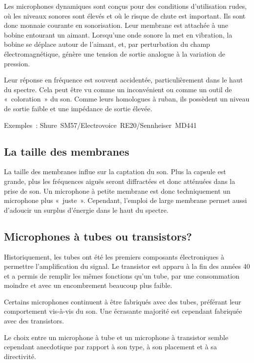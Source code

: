 \documentclass[
]{book}
\begin{document}
Les microphones dynamiques sont conçus pour des conditions d'utilisation rudes, où les niveaux sonores sont élevés et où le risque de chute est important. Ils sont donc monnaie courante en sonorisation. Leur membrane est attachée à une bobine entourant un aimant. Lorsqu'une onde sonore la met en vibration, la bobine se déplace autour de l'aimant, et, par perturbation du champ électromagnétique, génère une tension de sortie analogue à la variation de pression.

Leur réponse en fréquence est souvent accidentée, particulièrement dans le haut du spectre. Cela peut être vu comme un inconvénient ou comme un outil de «~coloration~» du son. Comme leurs homologues à ruban, ils possèdent un niveau de sortie faible et une impédance de sortie élevée.

Exemples~: Shure~SM57/Electrovoice~RE20/Sennheiser~MD441

\hypertarget{la-taille-des-membranes}{%
\subsection{La taille des membranes}\label{la-taille-des-membranes}}

La taille des membranes influe sur la captation du son. Plus la capsule est grande, plus les fréquences aiguës seront diffractées et donc atténuées dans la prise de son. Un microphone à petite membrane est donc techniquement un microphone plus «~juste~». Cependant, l'emploi de large membrane permet aussi d'adoucir un surplus d'énergie dans le haut du spectre.

\hypertarget{microphones-uxe0-tubes-ou-transistors}{%
\subsection{Microphones à tubes ou transistors?}\label{microphones-uxe0-tubes-ou-transistors}}

Historiquement, les tubes ont été les premiers composants électroniques à permettre l'amplification du signal. Le transistor est apparu à la fin des années 40 et a permis de remplir les mêmes fonctions qu'un tube, par une consommation moindre et avec un encombrement beaucoup plus faible.

Certains microphones continuent à être fabriqués avec des tubes, préférant leur comportement vis-à-vis du son. Une écrasante majorité est cependant fabriquée avec des transistors.

Le choix entre un microphone à tube et un microphone à transistor semble cependant anecdotique par rapport à son type, à son placement et à sa directivité.
\end{document}
